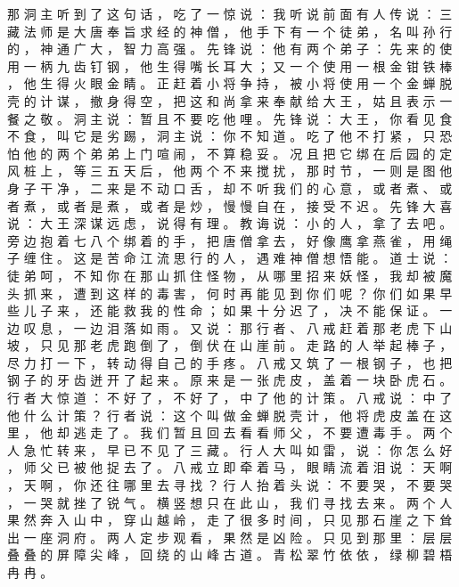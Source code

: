 {那 洞 主 听 到 了 这 句 话 ， 吃 了 一 惊 说 ： 我 听 说 前 面 有 人 传 说 ： 三 藏 法 师 是 大 唐 奉 旨 求 经 的 神 僧 ， 他 手 下 有 一 个 徒 弟 ， 名 叫 孙 行 的 ， 神 通 广 大 ， 智 力 高 强 。
先 锋 说 ： 他 有 两 个 弟 子 ： 先 来 的 使 用 一 柄 九 齿 钉 钢 ， 他 生 得 嘴 长 耳 大 ； 又 一 个 使 用 一 根 金 钳 铁 棒 ， 他 生 得 火 眼 金 睛 。
正 赶 着 小 将 争 持 ， 被 小 将 使 用 一 个 金 蝉 脱 壳 的 计 谋 ， 撤 身 得 空 ， 把 这 和 尚 拿 来 奉 献 给 大 王 ， 姑 且 表 示 一 餐 之 敬 。
洞 主 说 ： 暂 且 不 要 吃 他 哩 。
先 锋 说 ： 大 王 ， 你 看 见 食 不 食 ， 叫 它 是 劣 踢 ， 洞 主 说 ： 你 不 知 道 。
吃 了 他 不 打 紧 ， 只 恐 怕 他 的 两 个 弟 弟 上 门 喧 闹 ， 不 算 稳 妥 。
况 且 把 它 绑 在 后 园 的 定 风 桩 上 ， 等 三 五 天 后 ， 他 两 个 不 来 搅 扰 ， 那 时 节 ， 一 则 是 图 他 身 子 干 净 ， 二 来 是 不 动 口 舌 ， 却 不 听 我 们 的 心 意 ， 或 者 煮 、 或 者 煮 ， 或 者 是 煮 ， 或 者 是 炒 ， 慢 慢 自 在 ， 接 受 不 迟 。
先 锋 大 喜 说 ： 大 王 深 谋 远 虑 ， 说 得 有 理 。
教 诲 说 ： 小 的 人 ， 拿 了 去 吧 。
旁 边 抱 着 七 八 个 绑 着 的 手 ， 把 唐 僧 拿 去 ， 好 像 鹰 拿 燕 雀 ， 用 绳 子 缠 住 。
这 是 苦 命 江 流 思 行 的 人 ， 遇 难 神 僧 想 悟 能 。
道 士 说 ： 徒 弟 呵 ， 不 知 你 在 那 山 抓 住 怪 物 ， 从 哪 里 招 来 妖 怪 ， 我 却 被 魔 头 抓 来 ， 遭 到 这 样 的 毒 害 ， 何 时 再 能 见 到 你 们 呢 ？ 你 们 如 果 早 些 儿 子 来 ， 还 能 救 我 的 性 命 ； 如 果 十 分 迟 了 ， 决 不 能 保 证 。
一 边 叹 息 ， 一 边 泪 落 如 雨 。
又 说 ： 那 行 者 、 八 戒 赶 着 那 老 虎 下 山 坡 ， 只 见 那 老 虎 跑 倒 了 ， 倒 伏 在 山 崖 前 。
走 路 的 人 举 起 棒 子 ， 尽 力 打 一 下 ， 转 动 得 自 己 的 手 疼 。
八 戒 又 筑 了 一 根 钢 子 ， 也 把 钢 子 的 牙 齿 迸 开 了 起 来 。
原 来 是 一 张 虎 皮 ， 盖 着 一 块 卧 虎 石 。
行 者 大 惊 道 ： 不 好 了 ， 不 好 了 ， 中 了 他 的 计 策 。 八 戒 说 ： 中 了 他 什 么 计 策 ？ 行 者 说 ： 这 个 叫 做 金 蝉 脱 壳 计 ， 他 将 虎 皮 盖 在 这 里 ， 他 却 逃 走 了 。
我 们 暂 且 回 去 看 看 师 父 ， 不 要 遭 毒 手 。
两 个 人 急 忙 转 来 ， 早 已 不 见 了 三 藏 。
行 人 大 叫 如 雷 ， 说 ： 你 怎 么 好 ， 师 父 已 被 他 捉 去 了 。
八 戒 立 即 牵 着 马 ， 眼 睛 流 着 泪 说 ： 天 啊 ， 天 啊 ， 你 还 往 哪 里 去 寻 找 ？ 行 人 抬 着 头 说 ： 不 要 哭 ， 不 要 哭 ， 一 哭 就 挫 了 锐 气 。
横 竖 想 只 在 此 山 ， 我 们 寻 找 去 来 。
两 个 人 果 然 奔 入 山 中 ， 穿 山 越 岭 ， 走 了 很 多 时 间 ， 只 见 那 石 崖 之 下 耸 出 一 座 洞 府 。
两 人 定 步 观 看 ， 果 然 是 凶 险 。
只 见 到 那 里 ： 层 层 叠 叠 的 屏 障 尖 峰 ， 回 绕 的 山 峰 古 道 。
青 松 翠 竹 依 依 ， 绿 柳 碧 梧 冉 冉 。
}
